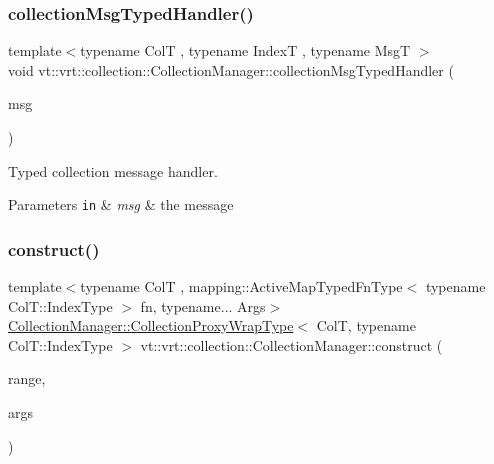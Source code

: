 \subsubsection{\texorpdfstring{collection\+Msg\+Typed\+Handler()}{collectionMsgTypedHandler()}}
{\footnotesize\ttfamily template$<$typename ColT , typename IndexT , typename MsgT $>$ \\
void vt\+::vrt\+::collection\+::\+Collection\+Manager\+::collection\+Msg\+Typed\+Handler (\begin{DoxyParamCaption}\item[{MsgT $\ast$}]{msg }\end{DoxyParamCaption})\hspace{0.3cm}{\ttfamily [static]}}



Typed collection message handler. 


\begin{DoxyParams}[1]{Parameters}
\mbox{\tt in}  & {\em msg} & the message \\
\hline
\end{DoxyParams}
\mbox{\label{structvt_1_1vrt_1_1collection_1_1_collection_manager_a4de84e9efd7a3948e3c20be549441cfd}} 
\subsubsection{\texorpdfstring{construct()}{construct()}\hspace{0.1cm}{\footnotesize\ttfamily [1/2]}}
{\footnotesize\ttfamily template$<$typename ColT , mapping\+::\+Active\+Map\+Typed\+Fn\+Type$<$ typename Col\+T\+::\+Index\+Type $>$ fn, typename... Args$>$ \\
\hyperlink{structvt_1_1vrt_1_1collection_1_1_collection_manager_a56458ed7f9bb22b631b9b3a745f42f94}{Collection\+Manager\+::\+Collection\+Proxy\+Wrap\+Type}$<$ ColT, typename Col\+T\+::\+Index\+Type $>$ vt\+::vrt\+::collection\+::\+Collection\+Manager\+::construct (\begin{DoxyParamCaption}\item[{typename Col\+T\+::\+Index\+Type}]{range,  }\item[{Args \&\&...}]{args }\end{DoxyParamCaption})}



